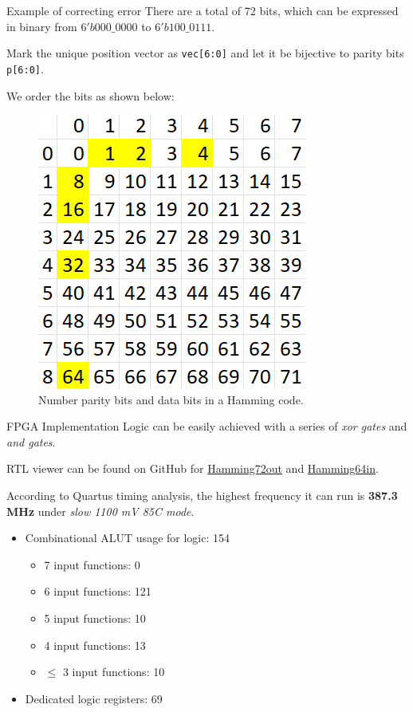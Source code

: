 \documentclass{beamer}
\begin{document}
\begin{frame}{Example of correcting error}
    There are a total of 72 bits, which can be expressed in binary from $6'b000\_0000$ to $6'b 100\_0111$.

    Mark the unique position vector as \texttt{vec[6:0]} and let it be bijective to
    parity bits \texttt{p[6:0]}.

    We order the bits as shown below:

    \begin{figure}[htbp]
        \centerline{\includegraphics[scale = 0.6]{Images/Hamming_bits_order.png}}
        \caption{Number parity bits and data bits in a Hamming code.}
    \end{figure}
\end{frame}

\begin{frame}{FPGA Implementation}
    Logic can be easily achieved with a series of \textit{xor gates} and \textit{and gates}.

    RTL viewer can be found on GitHub for \href{https://github.com/luckunately/ELEC433-Projects/blob/add-tex/Hamming72out/Hamming72out_RTL.pdf}{Hamming72out} and \href{https://github.com/luckunately/ELEC433-Projects/blob/add-tex/Hamming64in/Hamming64inRTL.pdf}{Hamming64in}.

    According to Quartus timing analysis, the highest frequency it can run is
    \textbf{387.3 MHz} under \textit{slow 1100 mV 85C mode}.

    \begin{itemize}
      \item Combinational ALUT usage for logic: 154
      \begin{itemize}
        \item 7 input functions: 0
        \item 6 input functions: 121
        \item 5 input functions: 10
        \item 4 input functions: 13
        \item $\leq$ 3 input functions: 10
      \end{itemize}
      \item Dedicated logic registers: 69
    \end{itemize}
\end{frame}
\end{document}
